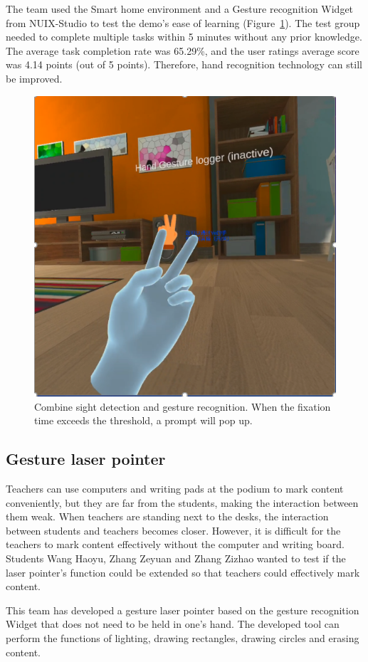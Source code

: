 The team used the Smart home environment and a Gesture recognition Widget from NUIX-Studio to test the demo's ease of learning (Figure~\ref{fig:Project7-figure}). The test group needed to complete multiple tasks within 5 minutes without any prior knowledge. The average task completion rate was 65.29\%, and the user ratings average score was 4.14 points (out of 5 points). Therefore, hand recognition technology can still be improved.

\begin{figure}
  \centering
  \includegraphics[width=0.6\linewidth]{figures/Project_7.png}
  \caption{Combine sight detection and gesture recognition. When the fixation time exceeds the threshold, a prompt will pop up.}
  \label{fig:Project7-figure}
\end{figure}

\subsection{Gesture laser pointer}
Teachers can use computers and writing pads at the podium to mark content conveniently, but they are far from the students, making the interaction between them weak. When teachers are standing next to the desks, the interaction between students and teachers becomes closer. However, it is difficult for the teachers to mark content effectively without the computer and writing board. Students Wang Haoyu, Zhang Zeyuan and Zhang Zizhao wanted to test if the laser pointer's function could be extended so that teachers could effectively mark content.

This team has developed a gesture laser pointer based on the gesture recognition Widget that does not need to be held in one's hand.
The developed tool can perform the functions of lighting, drawing rectangles, drawing circles and erasing content.

